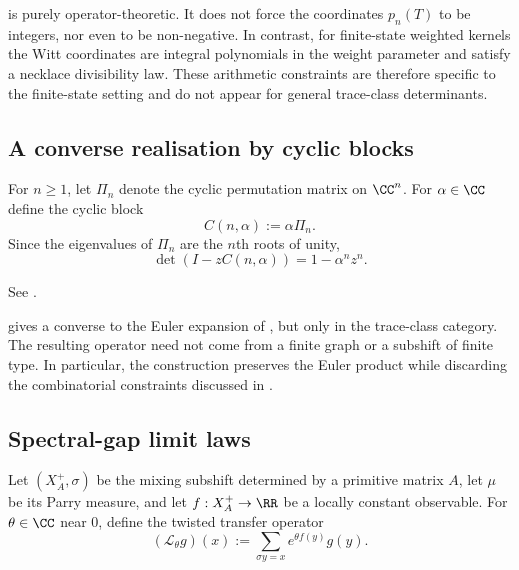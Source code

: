 \begin{remark}
  \label{rem:witt-audit-constraints}
   is purely operator-theoretic. It does
  not force the coordinates $p_n(T)$ to be integers, nor even to be
  non-negative. In contrast, for finite-state weighted kernels the
  Witt coordinates are integral polynomials in the weight parameter and
  satisfy a necklace divisibility law. These arithmetic
  constraints are therefore specific to the finite-state setting and do
  not appear for general trace-class determinants.
\end{remark}

\subsection{A converse realisation by cyclic blocks}

For $n\ge 1$, let $\Pi_n$ denote the cyclic permutation matrix on
$\CC^n$. For $\alpha\in\CC$ define the cyclic block
\[
  C(n,\alpha):=\alpha \Pi_n.
\]
Since the eigenvalues of $\Pi_n$ are the $n$th roots of unity,
\begin{equation}
  \label{eq:cycle-block-det}
  \det(I-zC(n,\alpha))=1-\alpha^n z^n.
\end{equation}

\begin{theorem}
  \label{thm:cyclic-fredholm-realisation}
  See \cite[Theorem~3.2]{MaZhang2026NormalTraceClassRealisations}.
\end{theorem}

\begin{remark}
   gives a converse to
  the Euler expansion of , but only in
  the trace-class category. The resulting operator need not come from a
  finite graph or a subshift of finite type. In particular, the
  construction preserves the Euler product while discarding the
  combinatorial constraints discussed in
  .
\end{remark}

\subsection{Spectral-gap limit laws}

Let $(X_A^+,\sigma)$ be the mixing subshift determined by a primitive
matrix $A$, let $\mu$ be its Parry measure, and let
$f:X_A^+\to\RR$ be a locally constant observable. For $\theta\in\CC$
near $0$, define the twisted transfer operator
\[
  (\mathcal L_\theta g)(x)
  :=\sum_{\sigma y=x} e^{\theta f(y)}g(y).
\]


